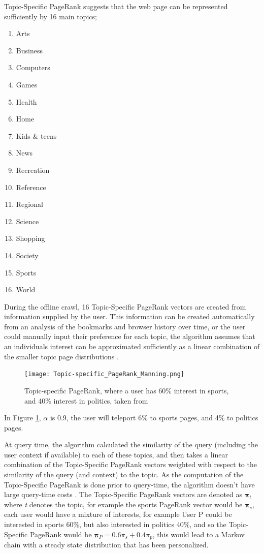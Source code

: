 \documentclass[11pt]{report}
\begin{document}
{Topic-Specific PageRank suggests that the web page can be represented sufficiently by 16 main topics;
\begin{enumerate}
\item Arts
\item Business
\item Computers
\item Games
\item Health
\item Home
\item Kids \& teens
\item News
\item Recreation
\item Reference
\item Regional
\item Science
\item Shopping
\item Society
\item Sports
\item World
\end{enumerate} During the offline crawl, 16 Topic-Specific PageRank vectors are created from information supplied by the user. This information can be created automatically from an analysis of the bookmarks and browser history over time, or the user could manually input their preference for each topic, the algorithm assumes that an individuals interest can be approximated sufficiently as a linear combination of the smaller topic page distributions \cite{manning}.

\begin{figure}[h!]
\centering
\texttt{[image: Topic-specific\_PageRank\_Manning.png]}
\caption{Topic-specific PageRank, where a user has 60\% interest in sports, and 40\% interest in politics, taken from \cite{manning}}
\label{fig:topic-specific}
\end{figure}

In Figure \ref{fig:topic-specific}, $\alpha$ is 0.9, the user will teleport 6\% to sports pages, and 4\% to politics pages.

At query time, the algorithm calculated the similarity of the query (including the user context if available) to each of these topics, and then takes a linear combination of the Topic-Specific PageRank vectors weighted with respect to the similarity of the query (and context) to the topic. As the computation of the Topic-Specific PageRank is done prior to query-time, the algorithm doesn't have large query-time costs \cite{haveliwala2002topic}.  The Topic-Specific PageRank vectors are denoted as $\boldsymbol{\pi}_t$ where \textit{t} denotes the topic, for example the sports PageRank vector would be $\boldsymbol{\pi}_s$, each user would have a mixture of interests, for example User P could be interested in sports 60\%, but also interested in politics 40\%, and so the Topic-Specific PageRank would be $\boldsymbol{\pi}_P=0.6\pi_s+0.4\pi_p$, this would lead to a Markov chain with a steady state distribution that has been personalized. 

}
\end{document}
